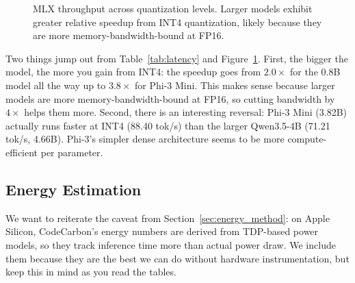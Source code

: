 \documentclass[11pt,a4paper]{article}
\begin{document}
\begin{figure}[htbp]
\centering
{}
\caption{MLX throughput across quantization levels. Larger models exhibit greater relative speedup from INT4 quantization, likely because they are more memory-bandwidth-bound at FP16.}
\label{fig:tokens_per_sec}
\end{figure}

Two things jump out from Table~\ref{tab:latency} and Figure~\ref{fig:tokens_per_sec}. First, the bigger the model, the more you gain from INT4: the speedup goes from $2.0\times$ for the 0.8B model all the way up to $3.8\times$ for Phi-3 Mini. This makes sense because larger models are more memory-bandwidth-bound at FP16, so cutting bandwidth by $4\times$ helps them more. Second, there is an interesting reversal: Phi-3 Mini (3.82B) actually runs faster at INT4 (88.40 tok/s) than the larger Qwen3.5-4B (71.21 tok/s, 4.66B). Phi-3's simpler dense architecture seems to be more compute-efficient per parameter.

\subsection{Energy Estimation}

We want to reiterate the caveat from Section~\ref{sec:energy_method}: on Apple Silicon, CodeCarbon's energy numbers are derived from TDP-based power models, so they track inference time more than actual power draw. We include them because they are the best we can do without hardware instrumentation, but keep this in mind as you read the tables.
\end{document}

